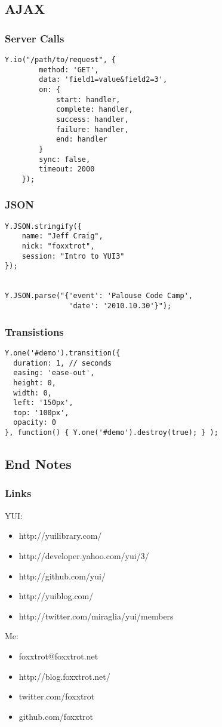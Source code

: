 \documentclass[t]{beamer}
\begin{document}
\subsection{AJAX}
\begin{frame}[fragile]
 \frametitle{Server Calls}
 \begin{verbatim}
Y.io("/path/to/request", {
        method: 'GET',
        data: 'field1=value&field2=3',
        on: {
            start: handler,
            complete: handler,
            success: handler,
            failure: handler,
            end: handler
        }
        sync: false,
        timeout: 2000
    });
 \end{verbatim}
\end{frame}

\begin{frame}[fragile]
 \frametitle{JSON}
\begin{verbatim}
Y.JSON.stringify({
    name: "Jeff Craig",
    nick: "foxxtrot",
    session: "Intro to YUI3"
});


Y.JSON.parse("{'event': 'Palouse Code Camp', 
               'date': '2010.10.30'}");

\end{verbatim}
\end{frame}

\begin{frame}[fragile]
 \frametitle{Transistions}
\begin{verbatim}
Y.one('#demo').transition({
  duration: 1, // seconds
  easing: 'ease-out',
  height: 0,
  width: 0,
  left: '150px',
  top: '100px',
  opacity: 0
}, function() { Y.one('#demo').destroy(true); } );
\end{verbatim}
\end{frame}

\subsection{End Notes}
\begin{frame}
 \frametitle{Links}
 YUI:
 \begin{itemize}
  \item http://yuilibrary.com/
  \item http://developer.yahoo.com/yui/3/
  \item http://github.com/yui/
  \item http://yuiblog.com/
  \item http://twitter.com/miraglia/yui/members
 \end{itemize}

 Me:
 \begin{itemize}
  \item foxxtrot@foxxtrot.net
  \item http://blog.foxxtrot.net/
  \item twitter.com/foxxtrot
  \item github.com/foxxtrot
 \end{itemize}
\end{frame}
\end{document}
